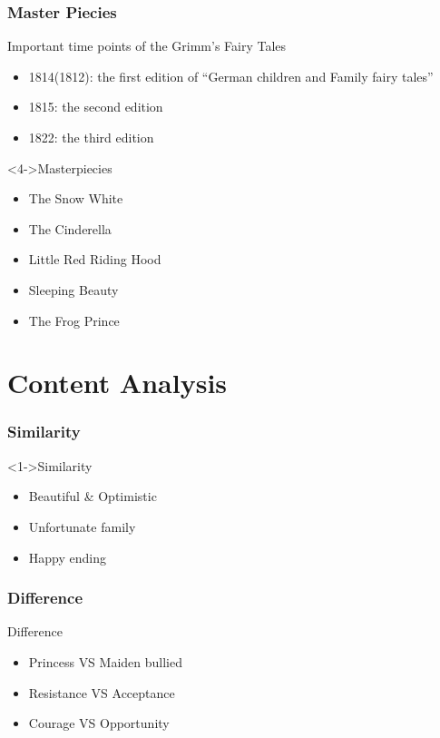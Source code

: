 \documentclass{beamer}
\begin{document}
\begin{frame}
    \frametitle{Master Piecies}
    \begin{block}{Important time points of the Grimm's Fairy Tales}
        \begin{itemize}
            \item<1-> 1814(1812): the first edition of ``German children and Family fairy tales''\cite[baidu]{baidubaike}\cite[wiki]{wikipedia}
            \item<2-> 1815: the second edition
            \item<3-> 1822: the third edition %
        \end{itemize}
    \end{block}
    \begin{block}<4->{Masterpiecies}
        \begin{itemize}
            \item<5-> \alert{The Snow White}
            \item<5-> \alert{The Cinderella}
            \item<4-> Little Red Riding Hood
            \item<4-> Sleeping Beauty
            \item<4-> The Frog Prince
        \end{itemize}
    \end{block}
\end{frame}

\section{Content Analysis}

\begin{frame}
    \frametitle{Similarity}
    \Large
    \begin{block}<1->{Similarity}
        \begin{itemize}
            \item Beautiful \& Optimistic
            \item Unfortunate family
            \item Happy ending
        \end{itemize}
    \end{block}
\end{frame}

\begin{frame}
    \frametitle{Difference}
    \Large
    \begin{block}{Difference}
        \begin{itemize}
            \item Princess \alert{VS} Maiden bullied
            \item Resistance \alert{VS} Acceptance
            \item Courage \alert{VS} Opportunity
        \end{itemize}
    \end{block}
\end{frame}
\end{document}
